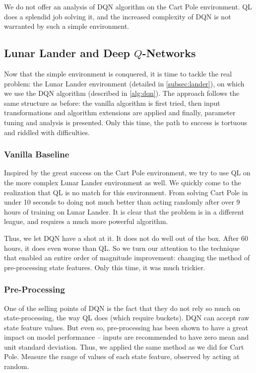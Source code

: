 \documentclass{article}
\begin{document}
We do not offer an analysis of DQN algorithm on the Cart Pole environment. QL does a splendid job solving it, and the increased complexity of DQN is not warranted by such a simple environment.



\subsection{Lunar Lander and Deep $Q$-Networks}
\label{ssec:lander-dqn}

Now that the simple environment is conquered, it is time to tackle the real problem: the Lunar Lander environment (detailed in \ref{subsec:lander}), on which we use the DQN algorithm (described in \ref{alg:dqn}). The approach follows the same structure as before: the vanilla algorithm is first tried, then input transformations and algorithm extensions are applied and finally, parameter tuning and analysis is presented. Only this time, the path to success is tortuous and riddled with difficulties.

\subsubsection{Vanilla Baseline}

Inspired by the great success on the Cart Pole environment, we try to use QL on the more complex Lunar Lander environment as well. We quickly come to the realization that QL is no match for this environment. From solving Cart Pole in under 10 seconds to doing not much better than acting randomly after over 9 hours of training on Lunar Lander. It is clear that the problem is in a different league, and requires a much more powerful algorithm.

Thus, we let DQN have a shot at it. It does not do well out of the box. After 60 hours, it does even worse than QL. So we turn our attention to the technique that enabled an entire order of magnitude improvement: changing the method of pre-processing state features. Only this time, it was much trickier. 

\subsubsection{Pre-Processing}

One of the selling points of DQN is the fact that they do not rely so much on state-processing, the way QL does (which require buckets). DQN can accept raw state feature values. But even so, pre-processing has been shown to have a great impact on model performance -- inputs are recommended to have zero mean and unit standard deviation.  Thus, we applied the same method as we did for Cart Pole. Measure the range of values of each state feature, observed by acting at random. 
\end{document}
